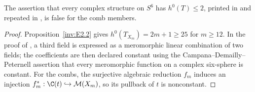 \begin{proposition}\hypertarget{tag-01SX}{}\label{inv:E2.4}

The assertion that every complex structure on $S^6$ has
$h^0(T)\le2$, printed in
\citet[Corollary~1.3, preprint p.~2]{HKP2000}
and repeated in \citet[Remarks 1.2 and 9.26]{AC2026}, is false
for the comb members.
\end{proposition}


\begin{proof}
Proposition~\ref{inv:E2.2} gives $h^0(T_{X_m})=2m+1\ge25$ for $m\ge12$.
In the proof of \citet[Corollary~1.3, preprint p.~2]{HKP2000},
a third field is expressed as a meromorphic linear combination of two fields;
the coefficients are then declared constant using the
Campana--Demailly--Peternell assertion that every meromorphic function
on a complex six-sphere is constant. For the combs, the surjective algebraic reduction
$f_m$ induces an injection $f_m^*:\C(t)\hookrightarrow\mathcal M(X_m)$,
so its pullback of $t$ is nonconstant.
\end{proof}